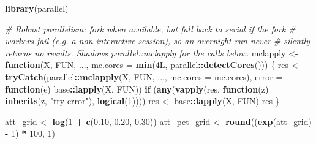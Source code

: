 \documentclass[
]{article}
\newenvironment{Shaded}{\begin{snugshade}}{\end{snugshade}}
\newcommand{\AttributeTok}[1]{\textcolor[rgb]{0.13,0.29,0.53}{#1}}
\newcommand{\CommentTok}[1]{\textcolor[rgb]{0.56,0.35,0.01}{\textit{#1}}}
\newcommand{\ControlFlowTok}[1]{\textcolor[rgb]{0.13,0.29,0.53}{\textbf{#1}}}
\newcommand{\DataTypeTok}[1]{\textcolor[rgb]{0.13,0.29,0.53}{#1}}
\newcommand{\DecValTok}[1]{\textcolor[rgb]{0.00,0.00,0.81}{#1}}
\newcommand{\FloatTok}[1]{\textcolor[rgb]{0.00,0.00,0.81}{#1}}
\newcommand{\FunctionTok}[1]{\textcolor[rgb]{0.13,0.29,0.53}{\textbf{#1}}}
\newcommand{\NormalTok}[1]{#1}
\newcommand{\OtherTok}[1]{\textcolor[rgb]{0.56,0.35,0.01}{#1}}
\newcommand{\SpecialCharTok}[1]{\textcolor[rgb]{0.81,0.36,0.00}{\textbf{#1}}}
\newcommand{\StringTok}[1]{\textcolor[rgb]{0.31,0.60,0.02}{#1}}
\begin{document}
\begin{Shaded}
\begin{Highlighting}[]
\FunctionTok{library}\NormalTok{(parallel)}

\CommentTok{\# Robust parallelism: fork when available, but fall back to serial if the fork}
\CommentTok{\# workers fail (e.g. a non{-}interactive session), so an overnight run never}
\CommentTok{\# silently returns no results. Shadows parallel::mclapply for the calls below.}
\NormalTok{mclapply }\OtherTok{\textless{}{-}} \ControlFlowTok{function}\NormalTok{(X, FUN, ..., }\AttributeTok{mc.cores =} \FunctionTok{min}\NormalTok{(}\DecValTok{4}\DataTypeTok{L}\NormalTok{, parallel}\SpecialCharTok{::}\FunctionTok{detectCores}\NormalTok{())) \{}
\NormalTok{  res }\OtherTok{\textless{}{-}} \FunctionTok{tryCatch}\NormalTok{(parallel}\SpecialCharTok{::}\FunctionTok{mclapply}\NormalTok{(X, FUN, ..., }\AttributeTok{mc.cores =}\NormalTok{ mc.cores),}
                  \AttributeTok{error =} \ControlFlowTok{function}\NormalTok{(e) base}\SpecialCharTok{::}\FunctionTok{lapply}\NormalTok{(X, FUN))}
  \ControlFlowTok{if}\NormalTok{ (}\FunctionTok{any}\NormalTok{(}\FunctionTok{vapply}\NormalTok{(res, }\ControlFlowTok{function}\NormalTok{(z) }\FunctionTok{inherits}\NormalTok{(z, }\StringTok{"try{-}error"}\NormalTok{), }\FunctionTok{logical}\NormalTok{(}\DecValTok{1}\NormalTok{))))}
\NormalTok{    res }\OtherTok{\textless{}{-}}\NormalTok{ base}\SpecialCharTok{::}\FunctionTok{lapply}\NormalTok{(X, FUN)}
\NormalTok{  res}
\NormalTok{\}}

\NormalTok{att\_grid     }\OtherTok{\textless{}{-}} \FunctionTok{log}\NormalTok{(}\DecValTok{1} \SpecialCharTok{+} \FunctionTok{c}\NormalTok{(}\FloatTok{0.10}\NormalTok{, }\FloatTok{0.20}\NormalTok{, }\FloatTok{0.30}\NormalTok{))}
\NormalTok{att\_pct\_grid }\OtherTok{\textless{}{-}} \FunctionTok{round}\NormalTok{((}\FunctionTok{exp}\NormalTok{(att\_grid) }\SpecialCharTok{{-}} \DecValTok{1}\NormalTok{) }\SpecialCharTok{*} \DecValTok{100}\NormalTok{, }\DecValTok{1}\NormalTok{)}


\end{Highlighting}
\end{Shaded}
\end{document}
